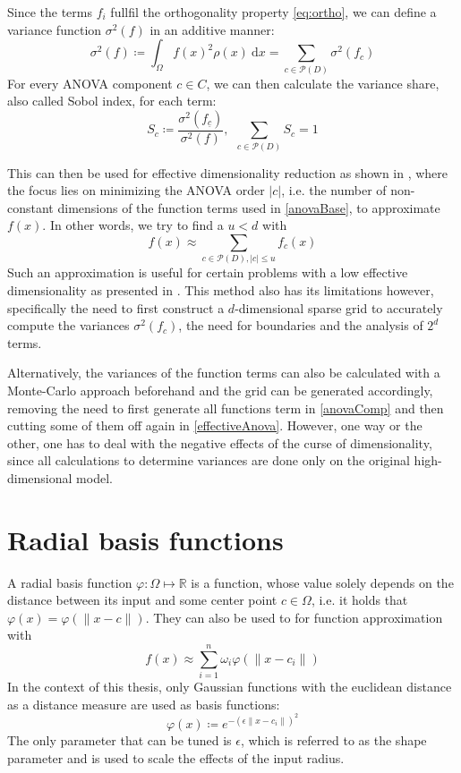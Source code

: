 \documentclass[
  a4paper,  %
  twoside,  %
  bibliography=totoc,
  headsepline,
  cleardoublepage=empty,
  parskip=half,
  draft=false
]{scrbook}
\begin{document}
Since the terms $f_i$ fullfil the orthogonality property \eqref{eq:ortho}, we can define a variance function $\sigma^2(f)$ in an additive manner:
\begin{equation}
\sigma^2(f) \coloneqq \int_{\Omega} f(x)^2 \rho(x) ~ \text{d} x=\sum_{c \in \mathcal{P}(D)} \sigma^2(f_c)
\end{equation}
For every ANOVA component $c \in C$, we can then calculate the variance share, also called Sobol index, for each term:
\begin{equation}
S_{c} \coloneqq \frac{\sigma^2(f_{\underline{c}} )}{\sigma^2(f)}, ~~ \sum_{c \in \mathcal{P}(D)} S_{c} = 1
\nonumber
\end{equation}

This can then be used for effective dimensionality reduction as shown in \cite{G13,F10}, where the focus lies on minimizing the ANOVA order $|c|$, i.e. the number of non-constant dimensions of the function terms used in \eqref{anovaBase}, to approximate $f(x)$.
In other words, we try to find a $u < d$ with
\begin{equation}
f(x) \approx \sum_{c \in \mathcal{P}(D), |c| \leq u} f_c(x)
\label{effectiveAnova}
\end{equation}
Such an approximation is useful for certain problems with a low effective dimensionality as presented in \cite{H08}.
This method also has its limitations however, specifically the need to first construct a $d$-dimensional sparse grid to accurately compute the variances $\sigma^2(f_c)$, the need for boundaries and the analysis of $2^d$ terms.

Alternatively, the variances of the function terms can also be calculated with a Monte-Carlo approach \cite{} beforehand and the grid can be generated accordingly, removing the need to first generate all functions term in \cref{anovaComp} and then cutting some of them off again in \cref{effectiveAnova}.
However, one way or the other, one has to deal with the negative effects of the curse of dimensionality, since all calculations to determine variances are done only on the original high-dimensional model.


\section{Radial basis functions}

A radial basis function $\varphi \colon \Omega \mapsto \mathds{R}$ is a function, whose value solely depends on the distance between its input and some center point $c \in \Omega$, i.e. it holds that $\varphi(x)=\varphi(\|x - c\|)$.
They can also be used to for function approximation with 
\begin{equation}
f(x) \approx \sum_{i=1}^n \omega_i \varphi(\|x - c_i\|)
\end{equation}
In the context of this thesis, only Gaussian functions \cite{} with the euclidean distance as a distance measure are used as basis functions:
\begin{equation}
\varphi(x) \coloneqq e^{-(\epsilon \|x - c_i\|)^2}
\end{equation}
The only parameter that can be tuned is $\epsilon$, which is referred to as the shape parameter and is used to scale the effects of the input radius.
\end{document}
